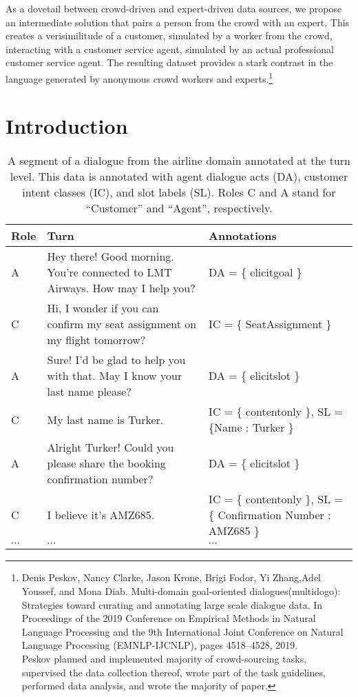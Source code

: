 As a dovetail between crowd-driven and expert-driven data sources, we propose an intermediate solution that pairs a person from the crowd with an expert.  
%
 This creates a verisimilitude of a customer, simulated by a worker from the crowd, interacting with a customer service agent, simulated by an actual professional customer service agent.  
%
The resulting dataset provides a stark contrast in the language generated by anonymous crowd workers and experts.\footnote{Denis Peskov,  Nancy Clarke,  Jason Krone,  Brigi Fodor,  Yi Zhang,Adel Youssef, and Mona Diab. Multi-domain goal-oriented dialogues(multidogo):  Strategies  toward  curating  and  annotating  large  scale dialogue data.  In Proceedings of  the 2019  Conference on  Empirical Methods in Natural Language Processing and the 9th International Joint Conference on Natural Language Processing (EMNLP-IJCNLP), pages 4518–4528, 2019.  \\
Peskov planned and implemented majority of crowd-sourcing tasks, supervised the data collection thereof, wrote part of the task guidelines,  performed data analysis, and wrote the majority of paper. 
}

\section{Introduction}


\begin{table*}[]
	\centering
	\small
	\begin{tabular}{p{.7 cm} p{7.8 cm} p{5 cm}}
		
		\textbf{Role}&  \textbf{ Turn } &  \textbf{Annotations} \\
		\hline
	
		A & Hey there! Good morning. You're connected to LMT Airways. How may I help you? & DA = \{ elicitgoal \} \\
		\rowcolor{gray!25}
		C & Hi, I wonder if you can confirm my seat assignment on my flight tomorrow? &  IC = \{ SeatAssignment \} \\
		A & Sure! I'd be glad to help you with that. May I know your last name please? &  DA = \{ elicitslot \} \\
				\rowcolor{gray!25}
		C &  My last name is Turker. & IC = \{ contentonly \}, 
		\newline SL = \{Name : Turker \} \\
		A & Alright Turker! Could you please share the booking confirmation number? & DA = \{ elicitslot \} \\
		\rowcolor{gray!25}
		C &  I believe it's AMZ685. & IC = \{ contentonly \}, 
		\newline SL = \{ Confirmation Number :  AMZ685 \} \\
		$\cdots$ & $\cdots$ & $\cdots$ \\
	\end{tabular}
	\caption{A segment of a dialogue from the airline domain annotated at the turn level.  This data is annotated with agent dialogue acts (DA), customer intent classes (IC), and slot labels (SL).  Roles C and A stand for ``Customer'' and ``Agent'', respectively.}
	\label{tab:TravelConvo}
\end{table*}



